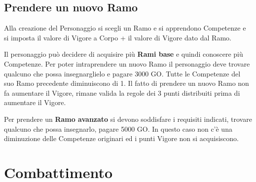 \documentclass[12pt,a4paper,twoside,openany]{book}
\begin{document}
\begin{multicols}{2}
\subsection{Prendere un nuovo Ramo}

Alla creazione del Personaggio si scegli un Ramo e si apprendono Competenze e si imposta il valore di Vigore a Corpo + il valore di Vigore dato dal Ramo.

Il personaggio può decidere di acquisire più \textbf{Rami base} e quindi conoscere più Competenze. Per poter intraprendere un nuovo Ramo il personaggio deve trovare qualcuno che possa insegnarglielo e pagare 3000 GO. Tutte le Competenze del suo Ramo precedente diminuiscono di 1.
Il fatto di prendere un nuovo Ramo non fa aumentare il Vigore, rimane valida la regole dei 3 punti distribuiti prima di aumentare il Vigore.

Per prendere un \textbf{Ramo avanzato} si devono soddisfare i requisiti indicati, trovare qualcuno che possa insegnarlo, pagare 5000 GO. In questo caso non c'è una diminuzione delle Competenze originari ed i punti Vigore non si acquisiscono.


\end{multicols}

\pagebreak

\section{Combattimento}\label{Combattimento}\hypertarget{Combattimento}{}
\end{document}
